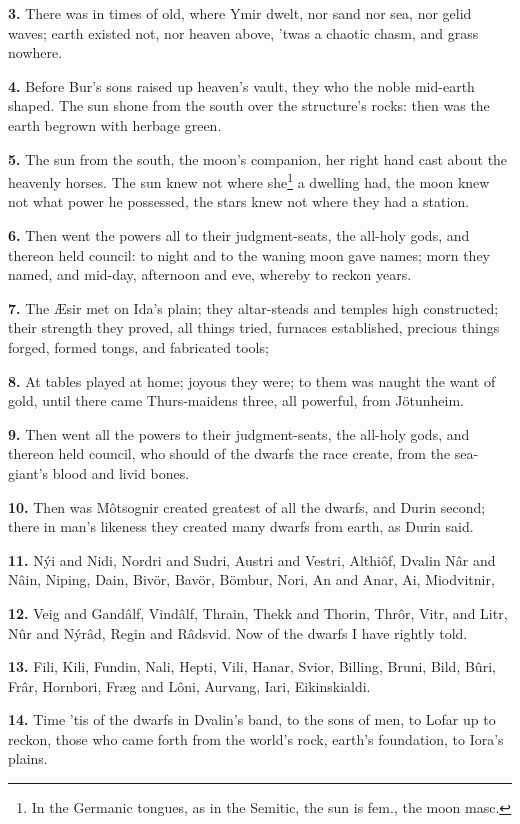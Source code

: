 \textbf{3.} There was in times of old, where Ymir dwelt, nor sand nor sea,
nor gelid waves; earth existed not, nor heaven above, 'twas a chaotic
chasm, and grass nowhere.

\textbf{4.} Before Bur's sons raised up heaven's vault, they who the noble
mid-earth shaped. The sun shone from the south over the structure's
rocks: then was the earth begrown with herbage green.

\textbf{5.} The sun from the south, the moon's companion, her right hand cast
about the heavenly horses. The sun knew not where she\footnote{In the Germanic tongues, as in the Semitic, the sun is
fem., the moon masc.} a dwelling
had, the moon knew not what power he possessed, the stars knew not
where they had a station.

\textbf{6.} Then went the powers all to their judgment-seats, the all-holy
gods, and thereon held council: to night and to the waning moon gave
names; morn they named, and mid-day, afternoon and eve, whereby to
reckon years.

\textbf{7.} The Æsir met on Ida's plain; they altar-steads and temples high
constructed; their strength they proved, all things tried, furnaces
established, precious things forged, formed tongs, and fabricated
tools;

\textbf{8.} At tables played at home; joyous they were; to them was naught
the want of gold, until there came Thurs-maidens three, all powerful,
from Jötunheim.

\textbf{9.} Then went all the powers to their judgment-seats, the all-holy
gods, and thereon held council, who should of the dwarfs the race
create, from the sea-giant's blood and livid bones.

\textbf{10.} Then was Môtsognir created greatest of all the dwarfs, and Durin
second; there in man's likeness they created many dwarfs from earth,
as Durin said.

\textbf{11.} Nýi and Nidi, Nordri and Sudri, Austri and Vestri, Althiôf,
Dvalin Nâr and Nâin, Niping, Dain, Bivör, Bavör, Bömbur, Nori, An and
Anar, Ai, Miodvitnir,

\textbf{12.} Veig and Gandâlf, Vindâlf, Thrain, Thekk and Thorin, Thrôr,
Vitr, and Litr, Nûr and Nýrâd, Regin and Râdsvid. Now of the dwarfs I
have rightly told.

\textbf{13.} Fili, Kili, Fundin, Nali, Hepti, Vili, Hanar, Svior, Billing,
Bruni, Bild, Bûri, Frâr, Hornbori, Fræg and Lôni, Aurvang, Iari,
Eikinskialdi.

\textbf{14.} Time 'tis of the dwarfs in Dvalin's band, to the sons of men, to
Lofar up to reckon, those who came forth from the world's rock,
earth's foundation, to Iora's plains.

